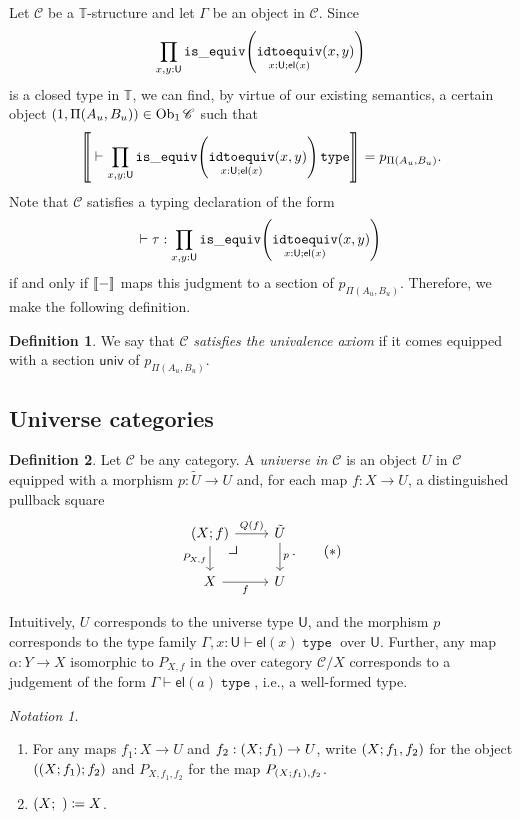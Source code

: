 \documentclass[10pt,letterpaper,cm]{nupset}
\theoremstyle{definition}
\newtheorem{definition}{Definition}[subsection]
\theoremstyle{theorem}
\theoremstyle{remark}
\newtheorem*{notation}{Notation}
\DeclareMathOperator{\ob}{Ob}
\newcommand{\U}{\mathsf{U}}
\newcommand{\el}{\mathsf{el}}
\newcommand{\univv}{\mathsf{univ}}
\newcommand{\0}{\mathbf{0}}
\newcommand{\1}{\mathbf{1}}
\newcommand{\2}{\mathbf{2}}
\DeclareMathOperator{\type}{\mathtt{type}}
\DeclareMathOperator{\isequiv}{\mathtt{is\_equiv}}
\DeclareMathOperator{\equiveq}{\mathtt{idtoequiv}}
\renewcommand{\c}{\mathscr{C}}
\newcommand{\T}{\mathbb T}
\newcommand{\be}{\begin{enumerate}}
\newcommand{\ee}{\end{enumerate}}
\begin{document}
\medskip

Let $\c$ be a $\T$-structure and let $\Gamma$ be an object in $\c$. Since $$ \prod_{x,y:\U} \isequiv\mleft(\equiveq_{{x:\U}; \el(x)}(x,y)\mright)$$ is a closed type in $\T$, we can find, by virtue of our existing semantics, a certain object $\mleft(1, \Pi(A_u, B_u)\mright) \in \ob_{1}{\c}$ such that $$\mleft\llbracket{{ }\vdash \prod_{x,y:\U} \isequiv\mleft(\equiveq_{{x:\U}; \el(x)}(x,y)\mright) \type}\mright\rrbracket = p_{ \Pi(A_u, B_u)} .$$ Note that $\c$ satisfies a typing declaration of the form $$ \vdash \tau :  \prod_{x,y:\U} \isequiv\mleft(\equiveq_{{x:\U}; \el(x)}(x,y)\mright)$$ if and only if $\mleft\llbracket{-}\mright\rrbracket$ maps this judgment to a section of $p_{ \Pi(A_u, B_u)}$. Therefore, we make the following definition.

\begin{definition}
We say that $\c$ \textit{satisfies the univalence axiom} if it comes equipped with a section $\univv$ of $p_{ \Pi(A_u, B_u)}$.
\end{definition}

\subsection{Universe categories}


\begin{definition}\label{univ1}
Let $\c$ be any category. A \textit{universe in $\c$} is an object $U$ in $\c$ equipped with a morphism $p: \tilde{U} \to U$ and, for each map $f: X \to U$, a distinguished pullback square
\[
\label{eqn:uobj} \begin{tikzcd}
\mleft(X; f\mright) \arrow[d, "{P_{X,f}}"'] \arrow[r, "Q(f)"] \arrow[dr, phantom, "\scalebox{1.5}{\color{black}$\lrcorner$}", very near start] & \tilde{U} \arrow[d, "p"] \\
X \arrow[r, "f"']                                           & U                       
\end{tikzcd}. \tag{$\ast$}
\]
\end{definition} 

Intuitively, $U$ corresponds to the universe type $\U$, and the morphism $p$ corresponds to the type family $\Gamma, x: \U \vdash \el(x) \type$ over $\U$. Further, any map $\alpha : Y \to X$ isomorphic to $P_{X,f}$ in the over category $\c/X$ corresponds to a judgement of the form $\Gamma \vdash \el(a) \type$, i.e., a well-formed type.  

\begin{notation} $ $
\be
\item For any maps $f_1 : X \to U$ and $f_2 : \mleft(X; f_1\mright) \to U$, write $\mleft(X; f_1, f_2\mright)$ for the object $\mleft(\mleft(X; f_1\mright); f_2\mright)$ and $P_{X, f_1, f_2}$ for the map $P_{\mleft(X; f_1\mright), f_2}$.
\item $\mleft(X; \ \mright) \coloneqq X$.
\ee
\end{notation}
\end{document}
